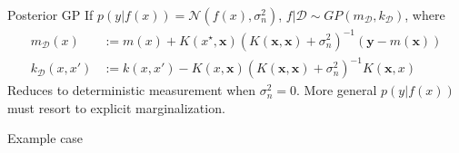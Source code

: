 \documentclass{beamer}
\begin{document}
\begin{frame}{}
\begin{block}{Posterior GP}
If $p(y|f(x)) = \mathcal{N}(f(x),\sigma_n^2)$, $f|\mathcal{D} \sim GP(m_\mathcal{D},k_\mathcal{D})$, where 
\begin{equation*}
\begin{split}
m_\mathcal{D}(x) & := m(x) + K(x^\star,\mathbf{x}) (K(\mathbf{x},\mathbf{x})+\sigma^2_n)^{-1} (\mathbf{y} - m(\mathbf{x})) \\
k_\mathcal{D}(x,x') & := k(x,x') - K(x,\mathbf{x})(K(\mathbf{x},\mathbf{x})+\sigma_n^2)^{-1}K(\mathbf{x},x)
\end{split}
\end{equation*}
Reduces to deterministic measurement when $\sigma_n^2 = 0$. More general $p(y|f(x))$ must resort to explicit marginalization.
\end{block}
\end{frame}

\begin{frame}{}
\begin{block}{Example case}


\begin{figure}
\centering
\captionsetup[subfigure]{labelformat=empty}

\end{figure}

\end{block}
\end{frame}
\end{document}

